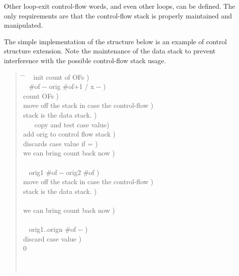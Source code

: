 Other loop-exit control-flow words, and even other loops, can be
defined. The only requirements are that the control-flow stack is
properly maintained and manipulated.

The simple implementation of the  structure
below is an example of control structure extension. Note the
maintenance of the data stack to prevent interference with the
possible control-flow stack usage.

\begin{quote}\ttfamily
  \begin{tabbing}
	\tab \= \hspace{10em} \=    ~  init count of OFs ) \\[2\parskip]

	\+ \word{:} ~  \#of -{}- orig \#of+1 / x -{}- ) \\
							\>  count OFs ) \\
							\>  move off the stack in case the control-flow ) \\
									\>  stack is the data stack. ) \\
		 ~  \word{=}~
								 copy and test case value) \\
		 	\>  add orig to control flow stack ) \\
		 	\>  discards case value if = ) \\
	\-					\>  we can bring count back now ) \\
	\word{;}  \\[2\parskip]

	\+ \word{:} ~  orig1 \#of -{}- orig2 \#of ) \\
							\>  move off the stack in case the control-flow ) \\
									\>  stack is the data stack. ) \\
		  \\
	\-					\>  we can bring count back now ) \\
	\word{;}  \\[2\parskip]

	\+ \word{:} ~  orig1..orign \#of -{}- ) \\
		 	\>  discard case value ) \\
		0  \\
		\tab {}  \\
	\-  \\
	\word{;} 
  \end{tabbing}
\end{quote}


